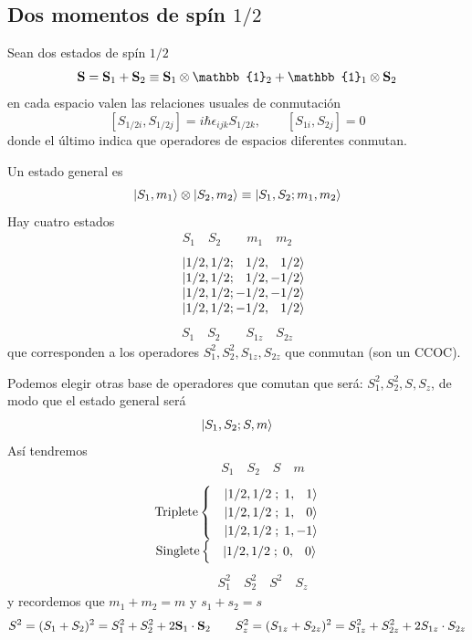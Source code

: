 \documentclass[10pt,oneside]{CBFT_book}
\begin{document}
\subsection{Dos momentos de spín $1/2$}

Sean dos estados de spín $1/2$
\[
	\vb{S} = \vb{S}_1 + \vb{S}_2 \equiv \vb{S}_1 \otimes \mathbb{1}_2 + \mathbb{1}_1\otimes \vb{S}_2
\]
en cada espacio valen las relaciones usuales de conmutación 
\[
	[ S_{1/2i},S_{1/2j}] = i\hbar\epsilon_{ijk}S_{1/2k}, \qquad  [S_{1i},S_{2j}] = 0
\]
donde el último indica que operadores de espacios diferentes conmutan.

Un estado general es 
\[
	\Ket{S_1,m_1} \otimes \Ket{S_2,m_2} \equiv \Ket{S_1, S_2;m_1,m_2}
\]
Hay cuatro estados
\[
	\begin{matrix} S_1 \quad S_2 \quad\quad m_1 \quad m_2 \end{matrix}
\]
\[
	\begin{matrix}
	&\Ket{1/2, 1/2 ; \phantom{-}1/2, \phantom{-}1/2} \\
	&\Ket{1/2, 1/2 ; \phantom{-}1/2, -1/2} \\
	&\Ket{1/2, 1/2 ; -1/2, -1/2} \\
	&\Ket{1/2, 1/2 ; -1/2, \phantom{-}1/2}
	\end{matrix}
\]	
\[	
	\begin{matrix} S_1 \quad S_2 \quad\quad S_{1z} \quad S_{2z}  \end{matrix}
\]
que corresponden a los operadores $S_ 1^2, S_2^2, S_{1z}, S_{2z}$ que conmutan (son un CCOC).

Podemos elegir otras base de operadores que comutan que será: $S_ 1^2, S_2^2, S, S_{z}$, de modo que el estado 
general será
\[
	\Ket{S_1, S_2;S,m}
\]
Así tendremos
\[
	\begin{matrix} \qquad\qquad S_1 \quad S_2 \quad S \quad m \end{matrix}
\]
\[
	\begin{matrix}
	\text{Triplete}\begin{cases}	
	&\Ket{1/2, 1/2 \; ; \; 1, \phantom{-}1} \\
	&\Ket{1/2, 1/2 \; ; \; 1, \phantom{-}0} \\
	&\Ket{1/2, 1/2 \; ; \; 1, -1} \\
	\end{cases}
	\\
	\text{Singlete}\begin{cases}
	&\Ket{1/2, 1/2 \; ; \; 0, \phantom{-}0} \\
	\end{cases}		
	\end{matrix}	 
\]	
\[	
	\begin{matrix} \qquad\qquad S_1^2 \quad S_2^2 \quad S^2 \quad S_z  \end{matrix}
\]
y recordemos que $m_1+m_2=m$ y $s_1+s_2=s$
\[
	S^2 = (S_1 + S_2)^2  = S_1^2 + S_2^2 + 2\vb{S}_1\cdot\vb{S}_2 \qquad 
	S^2_z = (S_{1z} + S_{2z})^2  = S_{1z}^2 + S_{2z}^2 + 2S_{1z}\cdot S_{2z}
\]
\end{document}
